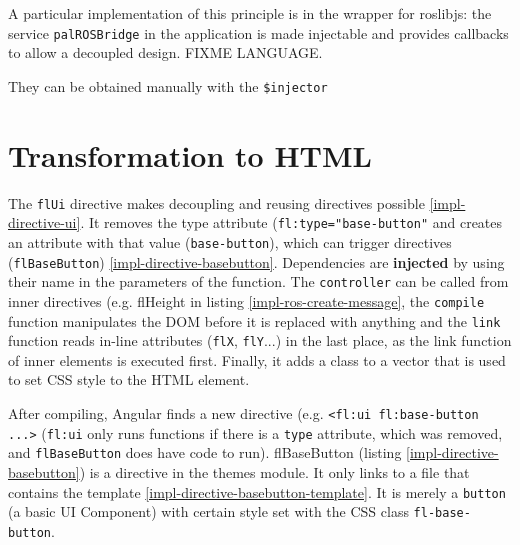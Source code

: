 A particular implementation of this principle is in the wrapper for roslibjs: the service \texttt{palROSBridge} in the application is made injectable and provides callbacks to allow a decoupled design. FIXME LANGUAGE.



They can be obtained manually with the \texttt{\$injector}



\section{Transformation to \ac{HTML}}

The \texttt{flUi} directive makes decoupling and reusing directives possible \ref{impl-directive-ui}.
It removes the type attribute (\texttt{fl:type="base-button"} and creates an attribute with that value (\texttt{base-button}), which can trigger directives (\texttt{flBaseButton}) \ref{impl-directive-basebutton}.
Dependencies are \textbf{injected} by using their name in the parameters of the function.
The \texttt{controller} can be called from inner directives (e.g. flHeight in listing \ref{impl-ros-create-message}, the \texttt{compile} function manipulates the \ac{DOM} before it is replaced with anything and the \texttt{link} function reads in-line attributes (\texttt{flX}, \texttt{flY}...) in the last place, as the link function of inner elements is executed first.
Finally, it adds a class to a vector that is used to set \ac{CSS} style to the \ac{HTML} element.



After compiling, Angular finds a new directive (e.g.  \lstinline$<fl:ui fl:base-button ...>$ (\texttt{fl:ui} only runs functions if there is a \texttt{type} attribute, which was removed, and \texttt{flBaseButton} does have code to run).
flBaseButton (listing \ref{impl-directive-basebutton}) is a directive in the themes module.
It only links to a file that contains the template \ref{impl-directive-basebutton-template}.
It is merely a \texttt{button} (a basic UI Component) with certain style set with the \ac{CSS} class \texttt{fl-base-button}.




